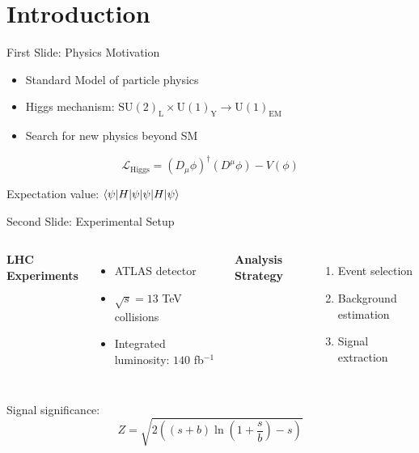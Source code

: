 \section{Introduction}

\begin{frame}{First Slide: Physics Motivation}
    \begin{itemize}
        \item Standard Model of particle physics
        \item Higgs mechanism: $\mathrm{SU(2)_L \times U(1)_Y \to U(1)_{EM}}$
        \item Search for new physics beyond SM
    \end{itemize}
    
    \begin{equation*}
        \mathcal{L}_{\text{Higgs}} = (D_\mu\phi)^\dagger(D^\mu\phi) - V(\phi)
    \end{equation*}
    
    Expectation value: $\braket{\psi | H | \psi}$
\end{frame}

\begin{frame}{Second Slide: Experimental Setup}
    \begin{columns}
        \textbf{LHC Experiments}
        \begin{itemize}
            \item \textsc{ATLAS} detector
            \item $\sqrt{s} = 13$ TeV collisions
            \item Integrated luminosity: $140$ fb$^{-1}$
        \end{itemize}
        
        \textbf{Analysis Strategy}
        \begin{enumerate}
            \item Event selection
            \item Background estimation
            \item Signal extraction
        \end{enumerate}
    \end{columns}
    
    \vspace{0.5cm}
    Signal significance: 
    \begin{equation*}
        Z = \sqrt{2\left((s+b)\ln\left(1+\frac{s}{b}\right)-s\right)}
    \end{equation*}
\end{frame}